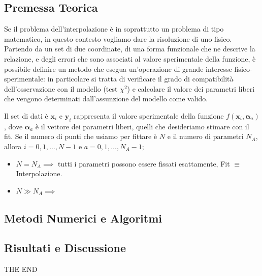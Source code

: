 \documentclass[11pt, a4paper]{article}
\begin{document}
\subsection{Premessa Teorica}
Se il problema dell'interpolazione è in soprattutto un problema di tipo matematico, in questo contesto vogliamo dare la risoluzione di uno fisico. Partendo da un set di due coordinate, di una forma funzionale che ne descrive la relazione, e degli errori che sono associati al valore sperimentale della funzione, è possibile definire un metodo che esegua un'operazione di grande interesse fisico-sperimentale: in particolare si tratta di verificare il grado di compatibilità dell'osservazione con il modello (test $\chi^2$) e calcolare il valore dei parametri liberi che vengono determinati dall'assunzione del modello come valido.

\medskip
Il set di dati è $\boldsymbol{x}_i$ e $\boldsymbol{y}_i$ rappresenta il valore sperimentale della funzione $f(\boldsymbol{x}_i, \boldsymbol{\alpha}_a)$, dove $\boldsymbol{\alpha}_a$ è il vettore dei parametri liberi, quelli che desideriamo stimare con il fit. Se il numero di punti che usiamo per fittare è $N$ e il numero di parametri $N_A$, allora $i = 0, 1, \dots, N-1$  e $a = 0, 1, \dots ,N_A-1$; 
\begin{itemize}
    \item $N = N_A \implies$ tutti i parametri possono essere fissati esattamente, Fit $\equiv$ Interpolazione.
    \item $N \gg N_A \implies$ 

\end{itemize}

\subsection{Metodi Numerici e Algoritmi}
\subsection{Risultati e Discussione}




\newpage





THE END

\end{document}
